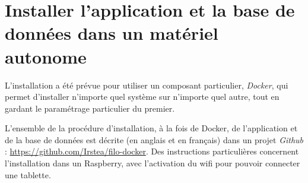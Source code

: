 \section{Installer l'application et la base de données dans un matériel autonome}

L'installation a été prévue pour utiliser un composant particulier, \textit{Docker}, qui permet d'installer n'importe quel système sur n'importe quel autre, tout en gardant le paramétrage particulier du premier.

L'ensemble de la procédure d'installation, à la fois de Docker, de l'application et de la base de données est décrite (en anglais et en français) dans un projet \textit{Github} : \href{https://github.com/Irstea/filo-docker}{https://github.com/Irstea/filo-docker}.
Des instructions particulières concernent l'installation dans un Raspberry, avec l'activation du wifi pour pouvoir connecter une tablette.

